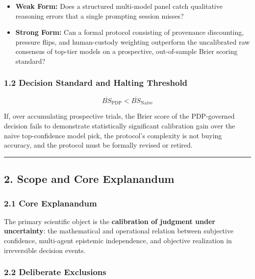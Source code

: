 \documentclass[
]{article}
\providecommand{\tightlist}{%
  \setlength{\itemsep}{0pt}\setlength{\parskip}{0pt}}
\begin{document}
\begin{itemize}
\tightlist
\item
  \textbf{Weak Form:} Does a structured multi-model panel catch
  qualitative reasoning errors that a single prompting session misses?
\item
  \textbf{Strong Form:} Can a formal protocol consisting of provenance
  discounting, pressure flips, and human-custody weighting outperform
  the uncalibrated raw consensus of top-tier models on a prospective,
  out-of-sample Brier scoring standard?
\end{itemize}

\subsubsection{1.2 Decision Standard and Halting
Threshold}\label{decision-standard-and-halting-threshold}

\[\overline{BS}_{\text{PDP}} < \overline{BS}_{\text{Naive}}\]

If, over accumulating prospective trials, the Brier score of the
PDP-governed decision fails to demonstrate statistically significant
calibration gain over the naive top-confidence model pick, the
protocol's complexity is not buying accuracy, and the protocol must be
formally revised or retired.

\begin{center}\rule{0.5\linewidth}{0.5pt}\end{center}

\subsection{2. Scope and Core
Explanandum}\label{scope-and-core-explanandum}

\subsubsection{2.1 Core Explanandum}\label{core-explanandum}

The primary scientific object is the \textbf{calibration of judgment
under uncertainty}: the mathematical and operational relation between
subjective confidence, multi-agent epistemic independence, and objective
realization in irreversible decision events.

\subsubsection{2.2 Deliberate Exclusions}\label{deliberate-exclusions}
\end{document}
